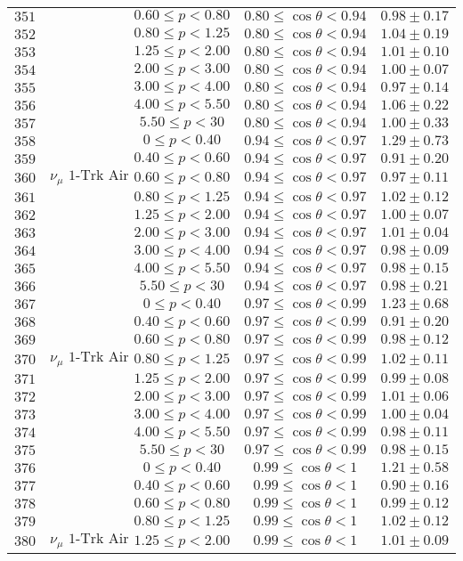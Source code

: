 \begin{longtable}[c]{ccccc}
$351$ &  & $0.60\leq p<0.80$ & $0.80\leq\cos\theta<0.94$ & $0.98\pm0.17$\tabularnewline
$352$ &  & $0.80\leq p<1.25$ & $0.80\leq\cos\theta<0.94$ & $1.04\pm0.19$\tabularnewline
$353$ &  & $1.25\leq p<2.00$ & $0.80\leq\cos\theta<0.94$ & $1.01\pm0.10$\tabularnewline
$354$ &  & $2.00\leq p<3.00$ & $0.80\leq\cos\theta<0.94$ & $1.00\pm0.07$\tabularnewline
$355$ &  & $3.00\leq p<4.00$ & $0.80\leq\cos\theta<0.94$ & $0.97\pm0.14$\tabularnewline
$356$ &  & $4.00\leq p<5.50$ & $0.80\leq\cos\theta<0.94$ & $1.06\pm0.22$\tabularnewline
$357$ &  & $5.50\leq p<30$ & $0.80\leq\cos\theta<0.94$ & $1.00\pm0.33$\tabularnewline
$358$ &  & $0\leq p<0.40$ & $0.94\leq\cos\theta<0.97$ & $1.29\pm0.73$\tabularnewline
$359$ &  & $0.40\leq p<0.60$ & $0.94\leq\cos\theta<0.97$ & $0.91\pm0.20$\tabularnewline
$360$ & $\nu_{\mu}\text{ 1-Trk Air}$ & $0.60\leq p<0.80$ & $0.94\leq\cos\theta<0.97$ & $0.97\pm0.11$\tabularnewline
$361$ &  & $0.80\leq p<1.25$ & $0.94\leq\cos\theta<0.97$ & $1.02\pm0.12$\tabularnewline
$362$ &  & $1.25\leq p<2.00$ & $0.94\leq\cos\theta<0.97$ & $1.00\pm0.07$\tabularnewline
$363$ &  & $2.00\leq p<3.00$ & $0.94\leq\cos\theta<0.97$ & $1.01\pm0.04$\tabularnewline
$364$ &  & $3.00\leq p<4.00$ & $0.94\leq\cos\theta<0.97$ & $0.98\pm0.09$\tabularnewline
$365$ &  & $4.00\leq p<5.50$ & $0.94\leq\cos\theta<0.97$ & $0.98\pm0.15$\tabularnewline
$366$ &  & $5.50\leq p<30$ & $0.94\leq\cos\theta<0.97$ & $0.98\pm0.21$\tabularnewline
$367$ &  & $0\leq p<0.40$ & $0.97\leq\cos\theta<0.99$ & $1.23\pm0.68$\tabularnewline
$368$ &  & $0.40\leq p<0.60$ & $0.97\leq\cos\theta<0.99$ & $0.91\pm0.20$\tabularnewline
$369$ &  & $0.60\leq p<0.80$ & $0.97\leq\cos\theta<0.99$ & $0.98\pm0.12$\tabularnewline
$370$ & $\nu_{\mu}\text{ 1-Trk Air}$ & $0.80\leq p<1.25$ & $0.97\leq\cos\theta<0.99$ & $1.02\pm0.11$\tabularnewline
$371$ &  & $1.25\leq p<2.00$ & $0.97\leq\cos\theta<0.99$ & $0.99\pm0.08$\tabularnewline
$372$ &  & $2.00\leq p<3.00$ & $0.97\leq\cos\theta<0.99$ & $1.01\pm0.06$\tabularnewline
$373$ &  & $3.00\leq p<4.00$ & $0.97\leq\cos\theta<0.99$ & $1.00\pm0.04$\tabularnewline
$374$ &  & $4.00\leq p<5.50$ & $0.97\leq\cos\theta<0.99$ & $0.98\pm0.11$\tabularnewline
$375$ &  & $5.50\leq p<30$ & $0.97\leq\cos\theta<0.99$ & $0.98\pm0.15$\tabularnewline
$376$ &  & $0\leq p<0.40$ & $0.99\leq\cos\theta<1$ & $1.21\pm0.58$\tabularnewline
$377$ &  & $0.40\leq p<0.60$ & $0.99\leq\cos\theta<1$ & $0.90\pm0.16$\tabularnewline
$378$ &  & $0.60\leq p<0.80$ & $0.99\leq\cos\theta<1$ & $0.99\pm0.12$\tabularnewline
$379$ &  & $0.80\leq p<1.25$ & $0.99\leq\cos\theta<1$ & $1.02\pm0.12$\tabularnewline
$380$ & $\nu_{\mu}\text{ 1-Trk Air}$ & $1.25\leq p<2.00$ & $0.99\leq\cos\theta<1$ & $1.01\pm0.09$\tabularnewline

\end{longtable}
